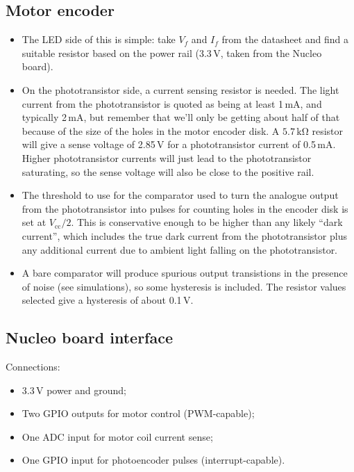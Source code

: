 \documentclass[a4paper,11pt,article]{memoir}
\begin{document}
\subsection*{Motor encoder}

\begin{itemize}
  \item{The LED side of this is simple: take $V_f$ and $I_f$ from the
    datasheet and find a suitable resistor based on the power rail
    (3.3\,V, taken from the Nucleo board).}
  \item{On the phototransistor side, a current sensing resistor is
    needed. The light current from the phototransistor is quoted as
    being at least 1\,mA, and typically 2\,mA, but remember that we'll
    only be getting about half of that because of the size of the
    holes in the motor encoder disk. A $5.7\,\mathrm{k\Omega}$
    resistor will give a sense voltage of 2.85\,V for a phototransistor
    current of 0.5\,mA. Higher phototransistor currents will just lead
    to the phototransistor saturating, so the sense voltage will also
    be close to the positive rail.}
  \item{The threshold to use for the comparator used to turn the
    analogue output from the phototransistor into pulses for counting
    holes in the encoder disk is set at $V_{\mathrm{cc}} / 2$. This is
    conservative enough to be higher than any likely ``dark current'',
    which includes the true dark current from the phototransistor plus
    any additional current due to ambient light falling on the
    phototransistor.}
  \item{A bare comparator will produce spurious output transistions in
    the presence of noise (see simulations), so some hysteresis is
    included. The resistor values selected give a hysteresis of about
    0.1\,V.}
\end{itemize}

\subsection*{Nucleo board interface}

Connections:
\begin{itemize}
  \item{3.3\,V power and ground;}
  \item{Two GPIO outputs for motor control (PWM-capable);}
  \item{One ADC input for motor coil current sense;}
  \item{One GPIO input for photoencoder pulses (interrupt-capable).}
\end{itemize}
\end{document}
